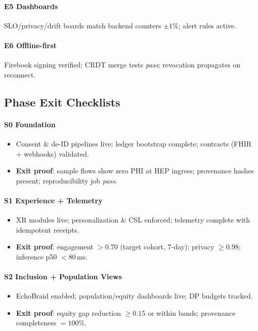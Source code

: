 \documentclass[11pt]{article}
\theoremstyle{plain}
\begin{document}
\paragraph{E5 Dashboards}
SLO/privacy/drift boards match backend counters $\pm1\%$; alert rules active.  
\paragraph{E6 Offline-first}
Firebook signing verified; CRDT merge tests \emph{pass}; revocation propagates on reconnect.

\subsection{Phase Exit Checklists}
\paragraph{S0 Foundation}
\begin{itemize}
  \item Consent \& de-ID pipelines live; ledger bootstrap complete; contracts (FHIR + webhooks) validated.
  \item \textbf{Exit proof}: sample flows show zero PHI at HEP ingress; provenance hashes present; reproducibility job \emph{pass}.
\end{itemize}

\paragraph{S1 Experience + Telemetry}
\begin{itemize}
  \item XR modules live; personalization \& CSL enforced; telemetry complete with idempotent receipts.
  \item \textbf{Exit proof}: engagement $>0.70$ (target cohort, 7-day); privacy $\ge 0.98$; inference p50 $<80$\,ms.
\end{itemize}

\paragraph{S2 Inclusion + Population Views}
\begin{itemize}
  \item EchoBraid enabled; population/equity dashboards live; DP budgets tracked.
  \item \textbf{Exit proof}: equity gap reduction $\ge 0.15$ or within bands; provenance completeness $=100\%$.
\end{itemize}
\end{document}
